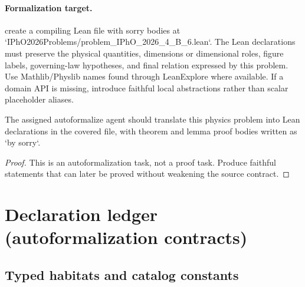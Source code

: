 \paragraph{Formalization target.}
create a compiling Lean file with sorry bodies at `IPhO2026Problems/problem\_IPhO\_2026\_4\_B\_6.lean`.
The Lean declarations must preserve the physical quantities, dimensions or dimensional roles, figure labels, governing-law hypotheses, and final relation expressed by this problem.
Use Mathlib/Physlib names found through LeanExplore where available. If a domain API is missing, introduce faithful local abstractions rather than scalar placeholder aliases.

\begin{theorem}
\label{thm:physics:IPhO_2026_4_B_6:target}
The assigned autoformalize agent should translate this physics problem into Lean declarations in the covered file, with theorem and lemma proof bodies written as `by sorry`.
\end{theorem}
\begin{proof}
This is an autoformalization task, not a proof task. Produce faithful statements that can later be proved without weakening the source contract.
\end{proof}


\section*{Declaration ledger (autoformalization contracts)}

\subsection*{Typed habitats and catalog constants}

